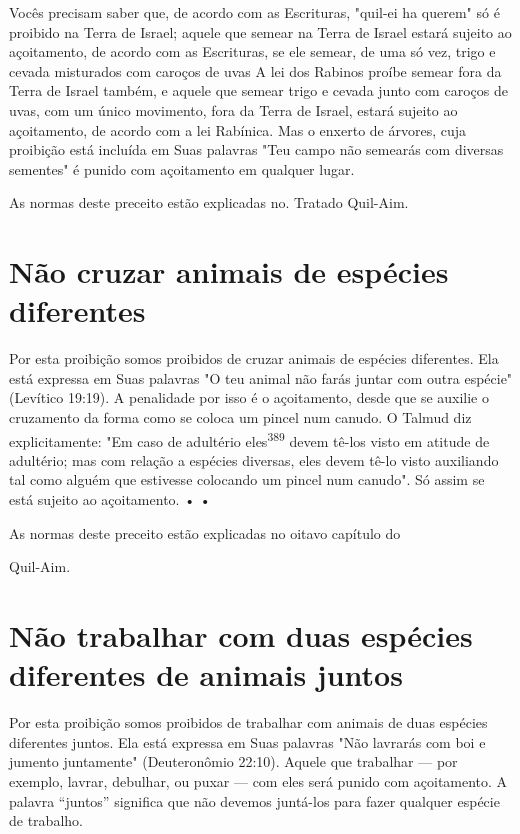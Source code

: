 Vocês precisam saber que, de acordo com as Escrituras, "quil-ei ha
querem" só é proibido na Terra de Israel; aquele que semear na Terra de
Israel estará sujeito ao açoitamento, de acordo com as Escrituras, se
ele semear, de uma só vez, trigo e cevada misturados com caroços de uvas
A lei dos Rabinos proíbe semear fora da Terra de Israel também, e aquele
que semear trigo e ce­vada junto com caroços de uvas, com um único
movimento, fora da Terra de Israel, estará sujeito ao açoitamento, de
acordo com a lei Rabínica. Mas o en­xerto de árvores, cuja proibição
está incluída em Suas palavras "Teu campo não semearás com diversas
sementes" é punido com açoitamento em qualquer lugar.


As normas deste preceito estão explicadas no. Tratado Quil-Aim.


\section{Não cruzar animais de espécies diferentes}

Por esta proibição somos proibidos de cruzar animais de espécies
diferentes. Ela está expressa em Suas palavras "O teu animal não farás
juntar com outra espécie" (Levítico 19:19). A penalidade por isso é o
açoitamento, desde que se auxilie o cruzamento da forma como se coloca
um pincel num canudo. O Talmud diz explicitamente: "Em caso de adultério
eles\textsuperscript{389} devem tê-los visto em atitude de adultério;
mas com relação a espécies diversas, eles devem tê-lo visto auxiliando
tal como alguém que estivesse colocando um pin­cel num canudo". Só assim
se está sujeito ao açoitamento. • •


As normas deste preceito estão explicadas no oitavo capítulo do


Quil-Aim.

\section{Não trabalhar com duas espécies diferentes de animais juntos}

Por esta proibição somos proibidos de trabalhar com animais de duas
espécies diferentes juntos. Ela está expressa em Suas palavras "Não
lavrarás com boi e jumento juntamente" (Deuteronômio 22:10). 
Aquele que trabalhar ---
por exemplo, lavrar, debulhar, ou puxar --- com eles será punido com
açoitamen­to. A palavra ``juntos'' significa que não devemos juntá-los
para fazer qualquer espécie de trabalho.

